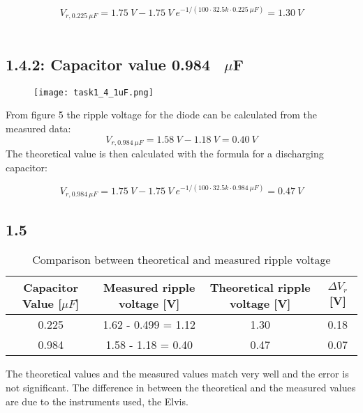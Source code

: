      $$ V_{r,0.225 \ \mu F} = 1.75 \ V - 1.75 \ V \ e^{-1/(100 \cdot 32.5k \cdot 0.225 \ \mu F)} = 1.30 \ V $$\\
\pagebreak
\subsection*{1.4.2: Capacitor value 0.984 \ \textbf{$\mu$}F}    

    \begin{figure}[h!]
        \centering
        \texttt{[image: task1\_4\_1uF.png]}
    \end{figure}
    
    From figure 5 the ripple voltage for the diode can be calculated from the measured data: $$V_{r,0.984 \ \mu F} = 1.58 \ V - 1.18 \ V = 0.40 \ V $$
     The theoretical value is then calculated with the formula for a discharging capacitor:
    
     $$ V_{r,0.984 \ \mu F} = 1.75 \ V - 1.75 \ V \ e^{-1/(100 \cdot 32.5k \cdot 0.984 \ \mu F)} = 0.47 \ V $$


    

\subsection*{1.5}
    
   \begin{table}[htbp]
     \centering
       \begin{tabular}{c|c|c|c}
       Capacitor Value [$\mu F$] & Measured ripple voltage [V] & Theoretical ripple voltage [V] & $\Delta V_r$ [V] \\
       \hline
       0.225         &     1.62 - 0.499 = 1.12        & 1.30 & 0.18 \\
       0.984         &     1.58 - 1.18 = 0.40         & 0.47 & 0.07 \\       
       \end{tabular}%
       \caption{Comparison between theoretical and measured ripple voltage}
     \label{tab:addlabel}%
   \end{table}%

The theoretical values and the measured values match very well and the error is not significant. The difference in between the theoretical and the measured values are due to the instruments used, the Elvis.
    



